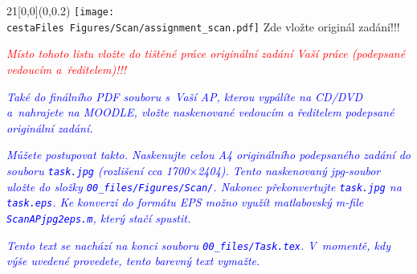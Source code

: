 ﻿\begin{textblock}{21}[0,0](0,0.2)
    \ifnum {}
        \texttt{[image: \\cestaFiles Figures/Scan/assignment\_scan.pdf]}
    \else
        \vglue 13cm
        \hspace{5cm}
        {\huge Zde vložte originál zadání!!!}
    \fi
\end{textblock}

\textcolor{red}{\em Místo tohoto listu vložte do tištěné práce originální zadání Vaší práce (podepsané vedoucím a~ře\-di\-te\-lem)!!!\/}

\textcolor{blue}{\em Také do finálního PDF souboru s~Vaší AP, kterou vypálíte na CD/DVD a~nahrajete na MOODLE, vložte naskenované vedoucím a ředitelem podepsané originální zadání.\/}

\textcolor{blue}{\em Můžete postupovat takto. Naskenujte celou A4 originálního podepsaného zadání do souboru \texttt{task.jpg} (rozlišení cca 1700$\times$2404). Tento naskenovaný jpg-soubor uložte do složky \texttt{00\_files/Figures/Scan/}. Nakonec překonvertujte \texttt{task.jpg} na \texttt{task.eps}. Ke konverzi do formátu EPS možno využít matlabovský m-file \texttt{ScanAPjpg2eps.m}, který stačí spustit.\/}

\textcolor{blue}{\em Tento text se nachází na konci souboru \texttt{00\_files/Task.tex}. V~momentě, kdy výše uvedené provedete, tento barevný text vymažte.\/} 
